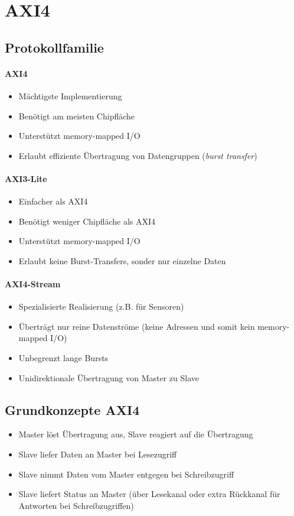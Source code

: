 	\section{AXI4}
		\subsection{Protokollfamilie}
			\paragraph{AXI4}
				\begin{itemize}
					\item Mächtigste Implementierung
					\item Benötigt am meisten Chipfläche
					\item Unterstützt memory-mapped I/O
					\item Erlaubt effiziente Übertragung von Datengruppen (\textit{burst transfer})
				\end{itemize}

			\paragraph{AXI3-Lite}
				\begin{itemize}
					\item Einfacher als AXI4
					\item Benötigt weniger Chipfläche als AXI4
					\item Unterstützt memory-mapped I/O
					\item Erlaubt keine Burst-Transfers, sonder nur einzelne Daten
				\end{itemize}

			\paragraph{AXI4-Stream}
				\begin{itemize}
					\item Spezialisierte Realisierung (z.B. für Sensoren)
					\item Überträgt nur reine Datenströme (keine Adressen und somit kein memory-mapped I/O)
					\item Unbegrenzt lange Bursts
					\item Unidirektionale Übertragung von Master zu Slave
				\end{itemize}

		\subsection{Grundkonzepte AXI4}
			\begin{itemize}
				\item Master löst Übertragung aus, Slave reagiert auf die Übertragung
				\item Slave liefer Daten an Master bei Lesezugriff
				\item Slave nimmt Daten vom Master entgegen bei Schreibzugriff
				\item Slave liefert Status an Master (über Lesekanal oder extra Rückkanal für Antworten bei Schreibzugriffen)
			\end{itemize}


